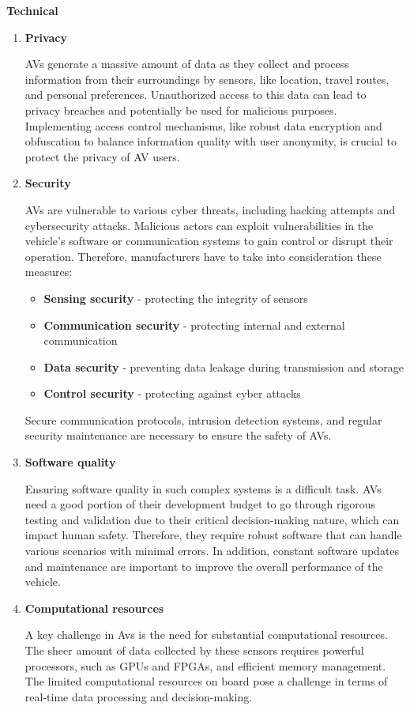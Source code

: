 \documentclass[10pt,oneside,english,a4paper]{article}
\begin{document}
\indent \textbf{Technical}
\begin{enumerate}
    \item \textbf{Privacy}
    \par AVs generate a massive amount of data as they collect and process information from their surroundings by sensors, like location, travel routes, and personal preferences. Unauthorized access to this data can lead to privacy breaches and potentially be used for malicious purposes. Implementing access control mechanisms, like robust data encryption and obfuscation to balance information quality with user anonymity, is crucial to protect the privacy of AV users.
    \item \textbf{Security}
    \par AVs are vulnerable to various cyber threats, including hacking attempts and cybersecurity attacks. Malicious actors can exploit vulnerabilities in the vehicle's software or communication systems to gain control or disrupt their operation. Therefore, manufacturers have to take into consideration these measures:
    \begin{itemize}
        \item \textbf{Sensing security} - protecting the integrity of sensors
        \item \textbf{Communication security} - protecting internal and external communication
        \item \textbf{Data security} - preventing data leakage during transmission and storage
        \item \textbf{Control security} - protecting against cyber attacks
    \end{itemize}
    Secure communication protocols, intrusion detection systems, and regular security maintenance are necessary to ensure the safety of AVs.
    \item \textbf{Software quality}
    \par Ensuring software quality in such complex systems is a difficult task. AVs need a good portion of their development budget to go through rigorous testing and validation due to their critical decision-making nature, which can impact human safety. Therefore, they require robust software that can handle various scenarios with minimal errors. In addition, constant software updates and maintenance are important to improve the overall performance of the vehicle.
    \item \textbf{Computational resources}
    \par  A key challenge in Avs is the need for substantial computational resources. The sheer amount of data collected by these sensors requires powerful processors, such as GPUs and FPGAs, and efficient memory management. The limited computational resources on board pose a challenge in terms of real-time data processing and decision-making. 
\end{enumerate}
\end{document}
